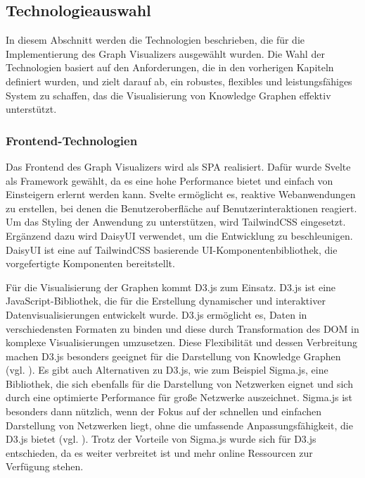 \subsection{Technologieauswahl}

In diesem Abschnitt werden die Technologien beschrieben, die für die Implementierung des Graph Visualizers ausgewählt wurden. Die Wahl der Technologien basiert auf den Anforderungen, die in den vorherigen Kapiteln definiert wurden, und zielt darauf ab, ein robustes, flexibles und leistungsfähiges System zu schaffen, das die Visualisierung von Knowledge Graphen effektiv unterstützt.

\subsubsection{Frontend-Technologien}

Das Frontend des Graph Visualizers wird als \ac{SPA} realisiert. Dafür wurde Svelte als Framework gewählt, da es eine hohe Performance bietet und einfach von Einsteigern erlernt werden kann. Svelte ermöglicht es, reaktive Webanwendungen zu erstellen, bei denen die Benutzeroberfläche auf Benutzerinteraktionen reagiert. Um das Styling der Anwendung zu unterstützen, wird TailwindCSS eingesetzt. Ergänzend dazu wird DaisyUI verwendet, um die Entwicklung zu beschleunigen. DaisyUI ist eine auf TailwindCSS basierende UI-Komponentenbibliothek, die vorgefertigte Komponenten bereitstellt.

Für die Visualisierung der Graphen kommt D3.js zum Einsatz. D3.js ist eine JavaScript-Bibliothek, die für die Erstellung dynamischer und interaktiver Datenvisualisierungen entwickelt wurde. D3.js ermöglicht es, Daten in verschiedensten Formaten zu binden und diese durch Transformation des \ac{DOM} in komplexe Visualisierungen umzusetzen. Diese Flexibilität und dessen Verbreitung machen D3.js besonders geeignet für die Darstellung von Knowledge Graphen (vgl. \cite{d3js:Bostock}). Es gibt auch Alternativen zu D3.js, wie zum Beispiel Sigma.js, eine Bibliothek, die sich ebenfalls für die Darstellung von Netzwerken eignet und sich durch eine optimierte Performance für große Netzwerke auszeichnet. Sigma.js ist besonders dann nützlich, wenn der Fokus auf der schnellen und einfachen Darstellung von Netzwerken liegt, ohne die umfassende Anpassungsfähigkeit, die D3.js bietet (vgl. \cite{sigmajs:Jacomy}). Trotz der Vorteile von Sigma.js wurde sich für D3.js entschieden, da es weiter verbreitet ist und mehr online Ressourcen zur Verfügung stehen.

